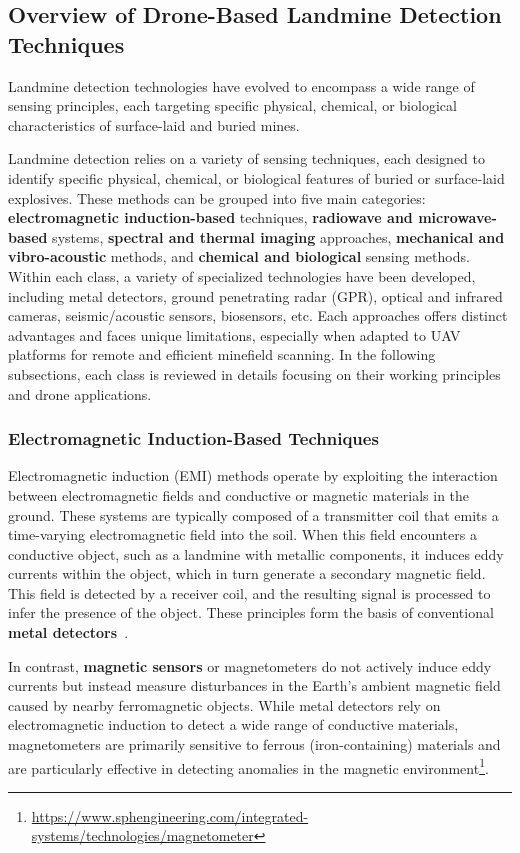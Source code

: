 \subsection{Overview of Drone-Based Landmine Detection Techniques}

Landmine detection technologies have evolved to encompass a wide range of sensing principles, each targeting specific physical, chemical, or biological characteristics of surface-laid and buried mines. 

Landmine detection relies on a variety of sensing techniques, each designed to identify specific physical, chemical, or biological features of buried or surface-laid explosives. These methods can be grouped into five main categories: \textbf{electromagnetic induction-based} techniques, \textbf{radiowave and microwave-based} systems, \textbf{spectral and thermal imaging} approaches, \textbf{mechanical and vibro-acoustic} methods, and \textbf{chemical and biological} sensing methods. Within each class, a variety of specialized technologies have been developed, including metal detectors, ground penetrating radar (GPR), optical and infrared cameras, seismic/acoustic sensors, biosensors, etc. Each approaches offers distinct advantages and faces unique limitations, especially when adapted to UAV platforms for remote and efficient minefield scanning. In the following subsections, each class is reviewed in details focusing on their working principles and drone applications.



\subsubsection{Electromagnetic Induction-Based Techniques}

Electromagnetic induction (EMI) methods operate by exploiting the interaction between electromagnetic fields and conductive or magnetic materials in the ground. These systems are typically composed of a transmitter coil that emits a time-varying electromagnetic field into the soil. When this field encounters a conductive object, such as a landmine with metallic components, it induces eddy currents within the object, which in turn generate a secondary magnetic field. This field is detected by a receiver coil, and the resulting signal is processed to infer the presence of the object. These principles form the basis of conventional \textbf{metal detectors}~\cite{gichd2006guidebook}.

In contrast, \textbf{magnetic sensors} or magnetometers do not actively induce eddy currents but instead measure disturbances in the Earth's ambient magnetic field caused by nearby ferromagnetic objects. While metal detectors rely on electromagnetic induction to detect a wide range of conductive materials, magnetometers are primarily sensitive to ferrous (iron-containing) materials and are particularly effective in detecting anomalies in the magnetic environment\footnote{\url{https://www.sphengineering.com/integrated-systems/technologies/magnetometer}}.

